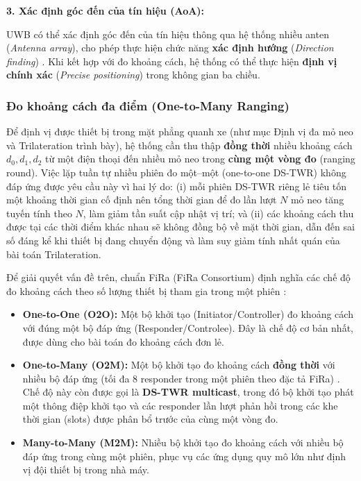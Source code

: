 \textbf{3. Xác định góc đến của tín hiệu (AoA):}
\par\vspace{0.3em}
UWB có thể xác định góc đến của tín hiệu thông qua hệ thống nhiều anten (\textit{Antenna array}), cho phép thực hiện chức năng \textbf{xác định hướng} (\textit{Direction finding}) \cite{bharadwaj2020accurate}. Khi kết hợp với đo khoảng cách, hệ thống có thể thực hiện \textbf{định vị chính xác} (\textit{Precise positioning}) trong không gian ba chiều.

\subsubsection{Đo khoảng cách đa điểm (One-to-Many Ranging)}

Để định vị được thiết bị trong mặt phẳng quanh xe (như mục Định vị đa mỏ neo và Trilateration trình bày), hệ thống cần thu thập \textbf{đồng thời} nhiều khoảng cách $d_0, d_1, d_2$ từ một điện thoại đến nhiều mỏ neo trong \textbf{cùng một vòng đo} (ranging round). Việc lặp tuần tự nhiều phiên đo một–một (one-to-one DS-TWR) không đáp ứng được yêu cầu này vì hai lý do: (i) mỗi phiên DS-TWR riêng lẻ tiêu tốn một khoảng thời gian cố định nên tổng thời gian để đo lần lượt $N$ mỏ neo tăng tuyến tính theo $N$, làm giảm tần suất cập nhật vị trí; và (ii) các khoảng cách thu được tại các thời điểm khác nhau sẽ không đồng bộ về mặt thời gian, dẫn đến sai số đáng kể khi thiết bị đang chuyển động và làm suy giảm tính nhất quán của bài toán Trilateration.

Để giải quyết vấn đề trên, chuẩn FiRa (FiRa Consortium) định nghĩa các chế độ đo khoảng cách theo số lượng thiết bị tham gia trong một phiên \cite{fira_uwb_ranging}:
\begin{itemize}
    \item \textbf{One-to-One (O2O):} Một bộ khởi tạo (Initiator/Controller) đo khoảng cách với đúng một bộ đáp ứng (Responder/Controlee). Đây là chế độ cơ bản nhất, được dùng cho bài toán đo khoảng cách đơn lẻ.
    \item \textbf{One-to-Many (O2M):} Một bộ khởi tạo đo khoảng cách \textbf{đồng thời} với nhiều bộ đáp ứng (tối đa 8 responder trong một phiên theo đặc tả FiRa) \cite{qorvo_o2m}. Chế độ này còn được gọi là \textbf{DS-TWR multicast}, trong đó bộ khởi tạo phát một thông điệp khởi tạo và các responder lần lượt phản hồi trong các khe thời gian (slots) được phân bổ trước của cùng một vòng đo.
    \item \textbf{Many-to-Many (M2M):} Nhiều bộ khởi tạo đo khoảng cách với nhiều bộ đáp ứng trong cùng một phiên, phục vụ các ứng dụng quy mô lớn như định vị đội thiết bị trong nhà máy.
\end{itemize}

